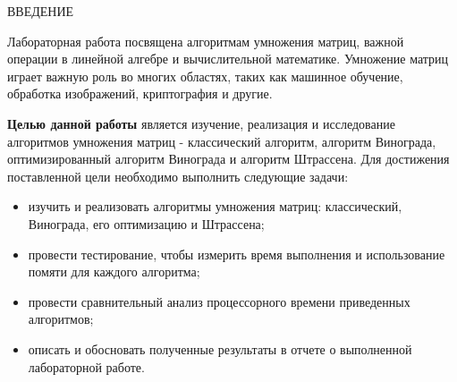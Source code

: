 \begin{center}
	ВВЕДЕНИЕ
\end{center}

Лабораторная работа посвящена алгоритмам умножения матриц, важной операции в линейной алгебре и вычислительной математике. Умножение матриц играет важную роль во многих областях, таких как машинное обучение, обработка изображений, криптография и другие.

\textbf{Целью данной работы} является изучение, реализация и исследование алгоритмов умножения матриц - классический алгоритм, алгоритм Винограда, оптимизированный алгоритм Винограда и алгоритм Штрассена. 
Для достижения поставленной цели необходимо выполнить следующие задачи:
\begin{itemize}
	\item изучить и реализовать алгоритмы умножения матриц: классический, Винограда, его оптимизацию и Штрассена;
    \item провести тестирование, чтобы измерить время выполнения и использование помяти для каждого алгоритма;
    \item провести сравнительный анализ процессорного времени приведенных алгоритмов;
	\item описать и обосновать полученные результаты в отчете о выполненной лабораторной работе.
\end{itemize}
